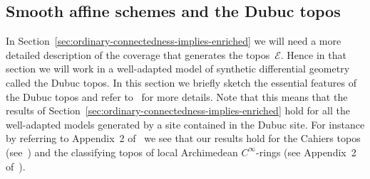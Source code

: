 \documentclass[pdftex]{sigma}
\numberwithin{equation}{section}
\begin{document}
\subsection{Smooth af\/f\/ine schemes and the Dubuc topos}\label{sec:dubuc-topos}

In Section~\ref{sec:ordinary-connectedness-implies-enriched} we will need a more detailed description of the coverage that generates the topos~$\mathcal{E}$. Hence in that section we will work in a well-adapted model of synthetic dif\/ferential geometry called the Dubuc topos. In this section we brief\/ly sketch the essential features of the Dubuc topos and refer to~\cite{1981EduardoJDubuc80} for more details. Note that this means that the results of Section~\ref{sec:ordinary-connectedness-implies-enriched} hold for all the well-adapted models generated by a site contained in the Dubuc site. For instance by referring to Appendix~2 of~\cite{MR1083355} we see that our results hold for the Cahiers topos (see~\cite{MR557083}) and the classifying topos of local Archimedean $C^{\infty}$-rings (see Appendix~2 of~\cite{MR1083355}).
\end{document}
